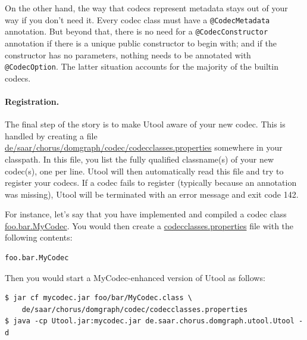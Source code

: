 On the other hand, the way that codecs represent metadata stays out of your way
if you don't need it. Every codec class must have a \verb?@CodecMetadata? annotation.
But beyond that, there is no need for a \verb?@CodecConstructor? annotation if there
is a unique public constructor to begin with; and if the constructor has no parameters,
nothing needs to be annotated with \verb?@CodecOption?. The latter situation
accounts for the majority of the builtin codecs.

\paragraph{Registration.}
The final step of the
story is to make Utool aware of your new codec. This is handled by
creating a file
\url{de/saar/chorus/domgraph/codec/codecclasses.properties} somewhere
in your classpath. In this file, you list the fully qualified
classname(s) of your new codec(s), one per line. Utool will then
automatically read this file and try to register your codecs. If
a codec fails to register (typically because an annotation was missing),
Utool will be terminated with an error message and exit code 142.

For instance, let's say that you have implemented and compiled a codec
class \url{foo.bar.MyCodec}. You would then create a
\url{codecclasses.properties} file with the following contents:

\begin{verbatim}
foo.bar.MyCodec
\end{verbatim}

Then you would start a  MyCodec-enhanced version
of Utool as follows:


\begin{verbatim}
$ jar cf mycodec.jar foo/bar/MyCodec.class \
    de/saar/chorus/domgraph/codec/codecclasses.properties
$ java -cp Utool.jar:mycodec.jar de.saar.chorus.domgraph.utool.Utool -d
\end{verbatim}








